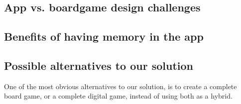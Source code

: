 \subsection{App vs. boardgame design challenges}
\subsection{Benefits of having memory in the app}
\subsection{Possible alternatives to our solution}
One of the most obvious alternatives to our solution, is to create a complete board game, or a complete digital game, instead of using both as a hybrid. 






